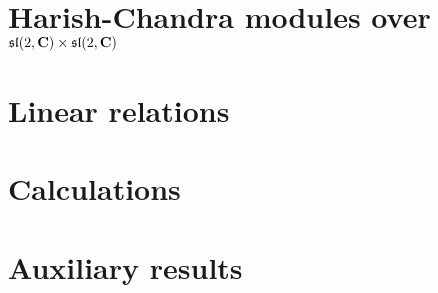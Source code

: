 \documentclass[]{./Bachelor}
\begin{document}
\frontmatter




\tableofcontents*

\mainmatter
\clearpage
\pagestyle{ruled}

\chapter{Harish-Chandra modules over \texorpdfstring{$\mathfrak{sl}(2,\mathbf{C})\times \mathfrak{sl}(2,\mathbf{C})$}{sl(2,C) x sl(2,C)}}\nocite{*}
\label{cha:first}











\chapter{Linear relations}
\label{cha:second}

\medskip

\printbibliography


\appendix

\chapter{Calculations}



















\chapter{Auxiliary results}




\end{document}
